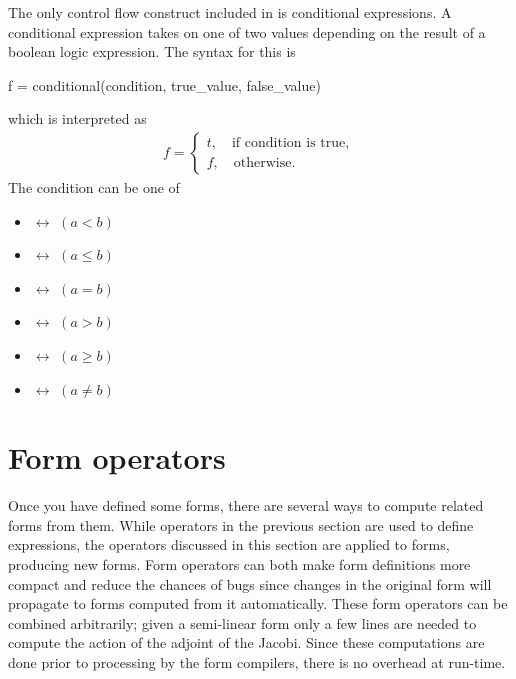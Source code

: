 The only control flow construct included in \ufl{} is
conditional expressions. A conditional expression
takes on one of two values depending on the result
of a boolean logic expression. The syntax for this is
\begin{code}
f = conditional(condition, true_value, false_value)
\end{code}
which is interpreted as
\begin{align}
f = \begin{cases}
    t, \quad \mbox{if condition is true}, \\
    f, \quad \mbox{otherwise}.
    \end{cases}
\end{align}
The condition can be one of
\begin{multicols}{2}
\begin{itemize}
\item {} $\leftrightarrow$ $(a < b)$
\item {} $\leftrightarrow$ $(a \le b)$
\item {} $\leftrightarrow$ $(a = b)$
\end{itemize}
\begin{itemize}
\item {} $\leftrightarrow$ $(a > b)$
\item {} $\leftrightarrow$ $(a \ge b)$
\item {} $\leftrightarrow$ $(a \ne b)$
\end{itemize}
\end{multicols}

\section{Form operators} \label{ufl:sec:formtransformations}

Once you have defined some forms, there are several ways to compute
related forms from them.  While operators in the previous section are
used to define expressions, the operators discussed in this section
are applied to forms, producing new forms.  Form operators can both
make form definitions more compact and reduce the chances of bugs
since changes in the original form will propagate to forms computed
from it automatically.  These form operators can be combined
arbitrarily; given a semi-linear form only a few lines are needed to
compute the action of the adjoint of the Jacobi.  Since these
computations are done prior to processing by the form compilers, there
is no overhead at run-time.

